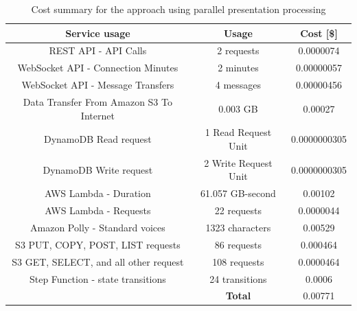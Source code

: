 \begin{table}[]
    \centering
    \begin{tabular}{ |c|c|c| } 
    \hline
    Service usage & Usage & Cost [\$] \\
    \hline
    REST API - API Calls & 2 requests & 0.0000074 \\
    WebSocket API - Connection Minutes & 2 minutes & 0.00000057 \\
    WebSocket API - Message Transfers & 4 messages & 0.00000456 \\
    \hline
    Data Transfer From Amazon S3 To Internet & 0.003 GB & 0.00027 \\
    \hline
    DynamoDB Read request & 1 Read Request Unit & 0.0000000305 \\
    DynamoDB Write request & 2 Write Request Unit & 0.0000000305 \\
    \hline
    AWS Lambda - Duration & 61.057 GB-second & 0.00102 \\
    AWS Lambda - Requests & 22 requests & 0.0000044 \\
    \hline
    Amazon Polly - Standard voices & 1323 characters & 0.00529 \\
    \hline
    S3 PUT, COPY, POST, LIST requests & 86 requests & 0.000464 \\
    S3 GET, SELECT, and all other request & 108 requests & 0.0000464 \\
    \hline
    Step Function - state transitions & 24 transitions & 0.0006 \\
    \hline
    \multicolumn{1}{c|}{} & \textbf{Total} & 0.00771 \\
    \cline{2-3}
    \end{tabular}
    \caption{Cost summary for the approach using parallel presentation processing}
    \label{table:case-study-service-parallel-spending-summary}
\end{table}

